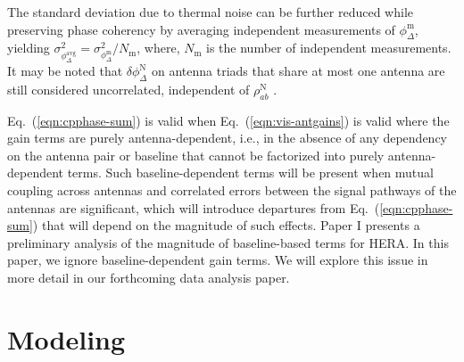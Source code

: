 \documentclass[
reprint,
superscriptaddress,
amsmath,
amssymb,
aps,
prd
]{revtex4-1}
\begin{document}

The standard deviation due to thermal noise can be further reduced while preserving phase coherency by averaging independent measurements of $\phi_\Delta^\textrm{m}$, yielding $\sigma_{\phi_\Delta^\textrm{avg}}^2 = \sigma_{\phi_\Delta^\textrm{m}}^2 / N_\textrm{m}$,
where, $N_\textrm{m}$ is the number of independent measurements. It may be noted that $\delta\phi_\Delta^\textrm{N}$ on antenna triads that share at most one antenna are still considered uncorrelated, independent of $\rho_{ab}^\textrm{N}$ \cite{kul89}.


Eq.~(\ref{eqn:cpphase-sum}) is valid when Eq.~(\ref{eqn:vis-antgains}) is valid where the gain terms are purely antenna-dependent, i.e., in the absence of any dependency on the antenna pair or baseline that cannot be factorized into purely antenna-dependent terms. Such baseline-dependent terms will be present when mutual coupling across antennas and correlated errors between the signal pathways of the antennas are significant, which will introduce departures from Eq.~(\ref{eqn:cpphase-sum}) that will depend on the magnitude of such effects. Paper I presents a preliminary analysis of the magnitude of baseline-based terms for HERA. In this paper, we ignore baseline-dependent gain terms. We will explore this issue in more detail in our forthcoming data analysis paper. 

\section{Modeling}\label{sec:modeling}
\end{document}
